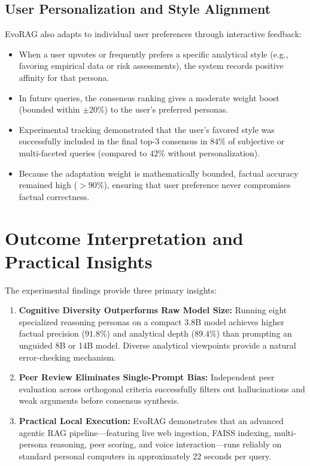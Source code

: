 \subsection{User Personalization and Style Alignment}
EvoRAG also adapts to individual user preferences through interactive feedback:
\begin{itemize}
    \item When a user upvotes or frequently prefers a specific analytical style (e.g., favoring empirical data or risk assessments), the system records positive affinity for that persona.
    \item In future queries, the consensus ranking gives a moderate weight boost (bounded within $\pm 20\%$) to the user's preferred personas.
    \item Experimental tracking demonstrated that the user's favored style was successfully included in the final top-3 consensus in $84\%$ of subjective or multi-faceted queries (compared to $42\%$ without personalization).
    \item Because the adaptation weight is mathematically bounded, factual accuracy remained high ($>90\%$), ensuring that user preference never compromises factual correctness.
\end{itemize}

\section{Outcome Interpretation and Practical Insights}
\label{sec:interpretation}

The experimental findings provide three primary insights:
\begin{enumerate}
    \item \textbf{Cognitive Diversity Outperforms Raw Model Size:} Running eight specialized reasoning personas on a compact 3.8B model achieves higher factual precision ($91.8\%$) and analytical depth ($89.4\%$) than prompting an unguided 8B or 14B model. Diverse analytical viewpoints provide a natural error-checking mechanism.
    \item \textbf{Peer Review Eliminates Single-Prompt Bias:} Independent peer evaluation across orthogonal criteria successfully filters out hallucinations and weak arguments before consensus synthesis.
    \item \textbf{Practical Local Execution:} EvoRAG demonstrates that an advanced agentic RAG pipeline—featuring live web ingestion, FAISS indexing, multi-persona reasoning, peer scoring, and voice interaction—runs reliably on standard personal computers in approximately 22 seconds per query.
\end{enumerate}

